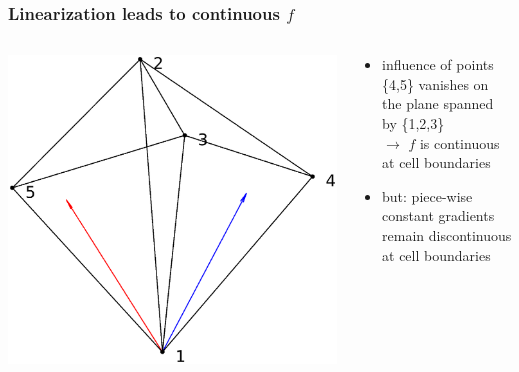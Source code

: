 \documentclass{beamer}
\begin{document}
\begin{frame}
\frametitle{Linearization leads to continuous $f$}
\begin{columns}[onlytextwidth]
	\begin{column}{0.45\textwidth}
		\begin{center}
		\includegraphics[trim={0 0 0 0.5cm},clip,width=1\textwidth]{FIGURES/linearization.eps}
	\end{center}
	\end{column}
	\begin{column}{0.55\textwidth}
		\begin{center}
		\begin{itemize}
			\item influence of points \{4,5\} vanishes on the plane spanned by \{1,2,3\}\\
			$\rightarrow$ $f$ is continuous at cell boundaries
			\item but: piece-wise constant gradients remain discontinuous at cell boundaries
		\end{itemize}
	\end{center}
\end{column}
\end{columns}
\end{frame}
\end{document}
